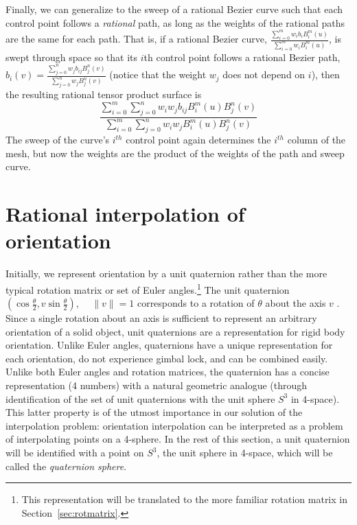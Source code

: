 Finally, we can generalize to the sweep of a rational Bezier
curve such that each control point follows a {\em rational} path,
as long as the weights of the rational paths are the same for each path.
That is, if a rational Bezier curve,
$\frac{\sum_{i=0}^{m} w_i b_i B_i^{m}(u)}{\sum_{i=0}^{m} w_i B_i^{m}(u)}$,
is swept through space so that its $i$th control point follows
a rational Bezier path, 
$b_i(v) = \frac{\sum_{j=0}^{n} w_j b_{ij} B_{j}^{n}(v)}
{\sum_{j=0}^{n} w_j B_{j}^{n}(v)}$
(notice that the weight $w_j$ does not depend on $i$),
then the resulting rational tensor product surface is
\begin{equation}
\label{eq:ratrat}
\frac{\sum_{i=0}^{m} \sum_{j=0}^n w_i w_j b_{ij} B_i^{m}(u) B_j^n(v)}
{\sum_{i=0}^{m} \sum_{j=0}^n w_i w_j B_i^{m}(u) B_j^n(v)}
\end{equation}
The sweep of the curve's $i^{th}$ control point again determines the
$i^{th}$ column of the mesh,
but now the weights are the product of the weights of the path and sweep curve.



\section{Rational interpolation of orientation}
\label{sec:orient-interp}

Initially, we represent orientation by a unit quaternion rather than the
more typical rotation matrix or set of Euler angles.\footnote{This
	representation will be translated to the more familiar rotation
	matrix in Section~\ref{sec:rotmatrix}.}
The unit quaternion
$(\cos \frac{\theta}{2}, v \sin \frac{\theta}{2})$, \ \ $\|v\| = 1$
corresponds to a rotation of $\theta$ about the axis $v$ \cite{shoemake85}.
Since a single rotation about an axis is sufficient
to represent an arbitrary orientation of a solid object,
unit quaternions are a representation for rigid body orientation.
Unlike Euler angles, quaternions have a unique representation 
for each orientation, do not experience gimbal lock, and can be
combined easily.
Unlike both Euler angles and rotation matrices,
the quaternion has a concise representation (4 numbers) with a natural
geometric analogue (through identification of the set of unit quaternions 
with the unit sphere $S^3$ in 4-space).
This latter property is of the utmost importance in our solution of the
interpolation problem: orientation interpolation can be interpreted as
a problem of interpolating points on a 4-sphere.
In the rest of this section, a unit quaternion will be identified
with a point on $S^3$, the unit sphere in 4-space, which will be
called the {\em quaternion sphere}.

